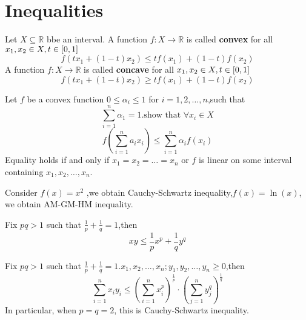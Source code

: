 \documentclass{book}
\numberwithin{equation}{section}
\begin{document}
\chapter{Inequalities}
\begin{definitionenv}
    Let $X\subseteq \mathbb{R}$ bbe an interval.
    \newline 
    A function $f:X\rightarrow \mathbb{R}$ is called \textbf{convex} for all $x_1,x_2\in X,t\in \interval{0}{1}$
    $$f(tx_1+(1-t)x_2)\le tf(x_1)+(1-t)f(x_2)$$
    \newline
    A function $f:X\rightarrow \mathbb{R}$ is called \textbf{concave} for all $x_1,x_2\in X,t\in \interval{0}{1}$
    $$f(tx_1+(1-t)x_2)\ge tf(x_1)+(1-t)f(x_2)$$
\end{definitionenv}
\begin{theoremenv}
    Let $f$ be a convex function $0\le \alpha_i\le 1$ for $i=1,2,\dots ,n$,such that 
    $$\sum_{i=1}^{n}\alpha_1=1.\text{show that } \forall x_i\in X$$
    $$f\left(\sum_{i=1}^{n}a_ix_i\right)\le \sum_{i=1}^{n}\alpha_if(x_i)$$
    Equality holds if and only if $x_1=x_2=\dots =x_n$ or $f$ is linear on some interval containing $x_1,x_2,\dots,x_n$.
\end{theoremenv}
\begin{remark}
    Consider $f(x)=x^2$ ,we obtain Cauchy-Schwartz inequality,$f(x)=\ln (x)$, we obtain AM-GM-HM inequality.
\end{remark}
\begin{theoremenv}
    \quad
    \newline
    Fix $pq>1$ such that $\frac{1}{p}+\frac{1}{q}=1$,then
    $$xy\le \frac{1}{p}x^p+\frac{1}{q}y^q$$
\end{theoremenv}
\begin{theoremenv}
    \quad
    \newline
    Fix $pq>1$ such that $\frac{1}{p}+\frac{1}{q}=1$.$x_1,x_2,\dots,x_n;y_1,y_2,\dots,y_n\ge 0$,then
    $$\sum_{i=1}^{n}x_iy_i\le \left(\sum_{i=1}^{n}x_i^p\right)^{\frac{1}{p}}\cdot\left(\sum_{j=1}^{n}y_j^q\right)^{\frac{1}{q}}$$
    In particular, when $p=q=2$, this is Cauchy-Schwartz inequality.
\end{theoremenv}
\end{document}
